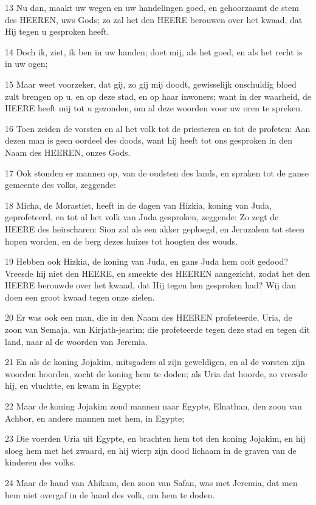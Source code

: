 \par 13 Nu dan, maakt uw wegen en uw handelingen goed, en gehoorzaamt de stem des HEEREN, uws Gods; zo zal het den HEERE berouwen over het kwaad, dat Hij tegen u gesproken heeft.
\par 14 Doch ik, ziet, ik ben in uw handen; doet mij, als het goed, en als het recht is in uw ogen;
\par 15 Maar weet voorzeker, dat gij, zo gij mij doodt, gewisselijk onschuldig bloed zult brengen op u, en op deze stad, en op haar inwoners; want in der waarheid, de HEERE heeft mij tot u gezonden, om al deze woorden voor uw oren te spreken.
\par 16 Toen zeiden de vorsten en al het volk tot de priesteren en tot de profeten: Aan dezen man is geen oordeel des doods, want hij heeft tot ons gesproken in den Naam des HEEREN, onzes Gods.
\par 17 Ook stonden er mannen op, van de oudsten des lands, en spraken tot de ganse gemeente des volks, zeggende:
\par 18 Micha, de Morastiet, heeft in de dagen van Hizkia, koning van Juda, geprofeteerd, en tot al het volk van Juda gesproken, zeggende: Zo zegt de HEERE des heirscharen: Sion zal als een akker geploegd, en Jeruzalem tot steen hopen worden, en de berg dezes huizes tot hoogten des wouds.
\par 19 Hebben ook Hizkia, de koning van Juda, en gans Juda hem ooit gedood? Vreesde hij niet den HEERE, en smeekte des HEEREN aangezicht, zodat het den HEERE berouwde over het kwaad, dat Hij tegen hen gesproken had? Wij dan doen een groot kwaad tegen onze zielen.
\par 20 Er was ook een man, die in den Naam des HEEREN profeteerde, Uria, de zoon van Semaja, van Kirjath-jearim; die profeteerde tegen deze stad en tegen dit land, naar al de woorden van Jeremia.
\par 21 En als de koning Jojakim, mitsgaders al zijn geweldigen, en al de vorsten zijn woorden hoorden, zocht de koning hem te doden; als Uria dat hoorde, zo vreesde hij, en vluchtte, en kwam in Egypte;
\par 22 Maar de koning Jojakim zond mannen naar Egypte, Elnathan, den zoon van Achbor, en andere mannen met hem, in Egypte;
\par 23 Die voerden Uria uit Egypte, en brachten hem tot den koning Jojakim, en hij sloeg hem met het zwaard, en hij wierp zijn dood lichaam in de graven van de kinderen des volks.
\par 24 Maar de hand van Ahikam, den zoon van Safan, was met Jeremia, dat men hem niet overgaf in de hand des volk, om hem te doden.


